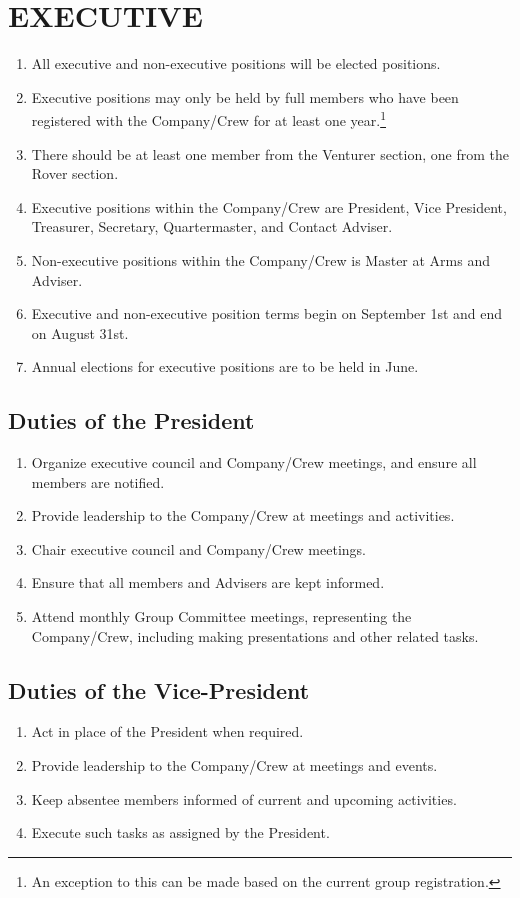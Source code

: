 \documentclass{Service_Corps_Document}
\begin{document}
\section{EXECUTIVE}
\begin{enumerate}
	\item All executive and non-executive positions will be elected positions.
	\item Executive positions may only be held by full members who have been registered with the Company/Crew for at least one year.\footnote{An exception to this can be made based on the current group registration.}
	\item There should be at least one member from the Venturer section, one from the Rover section. \footnotemark[\value{footnote}]
	\item Executive positions within the Company/Crew are President, Vice President, Treasurer, Secretary, Quartermaster, and Contact Adviser.
	\item Non-executive positions within the Company/Crew is Master at Arms and Adviser. 
	\item Executive and non-executive position terms begin on September 1st and end on August 31st.
	\item Annual elections for executive positions are to be held in June.
\end{enumerate}
\subsection{Duties of the President}
\begin{enumerate}
	\item Organize executive council and Company/Crew meetings, and ensure all members are notified.
	\item Provide leadership to the Company/Crew at meetings and activities. 
	\item Chair executive council and Company/Crew meetings.
	\item Ensure that all members and Advisers are kept informed.
	\item Attend monthly Group Committee meetings, representing the Company/Crew, including making presentations and other related tasks.
\end{enumerate}
\subsection{Duties of the Vice-President}
\begin{enumerate}
	\item Act in place of the President when required.
	\item Provide leadership to the Company/Crew at meetings and events. 
	\item Keep absentee members informed of current and upcoming activities.
	\item Execute such tasks as assigned by the President.
\end{enumerate}
\end{document}
